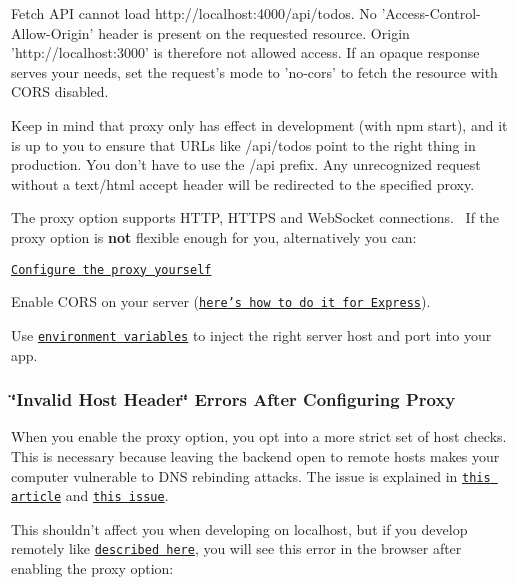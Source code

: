 \begin{DoxyCode}
Fetch API cannot load http://localhost:4000/api/todos. No 'Access-Control-Allow-Origin' header is present
       on the requested resource. Origin 'http://localhost:3000' is therefore not allowed access. If an opaque
       response serves your needs, set the request's mode to 'no-cors' to fetch the resource with CORS disabled.
\end{DoxyCode}


Keep in mind that {\ttfamily proxy} only has effect in development (with {\ttfamily npm start}), and it is up to you to ensure that U\+R\+Ls like {\ttfamily /api/todos} point to the right thing in production. You don’t have to use the {\ttfamily /api} prefix. Any unrecognized request without a {\ttfamily text/html} accept header will be redirected to the specified {\ttfamily proxy}.

The {\ttfamily proxy} option supports H\+T\+TP, H\+T\+T\+PS and Web\+Socket connections.~\newline
 If the {\ttfamily proxy} option is {\bfseries not} flexible enough for you, alternatively you can\+:


\begin{DoxyItemize}
\item \href{#configuring-the-proxy-manually}{\tt Configure the proxy yourself}
\item Enable C\+O\+RS on your server (\href{http://enable-cors.org/server_expressjs.html}{\tt here’s how to do it for Express}).
\item Use \href{#adding-custom-environment-variables}{\tt environment variables} to inject the right server host and port into your app.
\end{DoxyItemize}

\subsubsection*{\char`\"{}\+Invalid Host Header\char`\"{} Errors After Configuring Proxy}

When you enable the {\ttfamily proxy} option, you opt into a more strict set of host checks. This is necessary because leaving the backend open to remote hosts makes your computer vulnerable to D\+NS rebinding attacks. The issue is explained in \href{https://medium.com/webpack/webpack-dev-server-middleware-security-issues-1489d950874a}{\tt this article} and \href{https://github.com/webpack/webpack-dev-server/issues/887}{\tt this issue}.

This shouldn’t affect you when developing on {\ttfamily localhost}, but if you develop remotely like \href{https://github.com/facebookincubator/create-react-app/issues/2271}{\tt described here}, you will see this error in the browser after enabling the {\ttfamily proxy} option\+:

